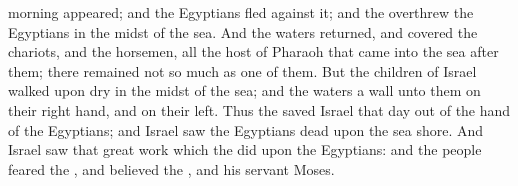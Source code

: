 {morning
appeared; and the
Egyptians
fled
against it; and the
{}
overthrew the
Egyptians in the
midst of the
sea.
And the
waters
returned, and
covered the
chariots, and the
horsemen,
{} all the
host of
Pharaoh that
came into the
sea
after them; there
remained not so much
as
one of them.
But the
children of
Israel
walked upon
dry
{} in the
midst of the
sea; and the
waters
{} a
wall unto them on their right
hand, and on their
left.
Thus the
{}
saved
Israel that
day out of the
hand of the
Egyptians; and
Israel
saw the
Egyptians
dead upon the
sea
shore.
And
Israel
saw that
great
work which the
{}
did upon the
Egyptians: and the
people
feared the
{}, and
believed the
{}, and his
servant
Moses.

}
